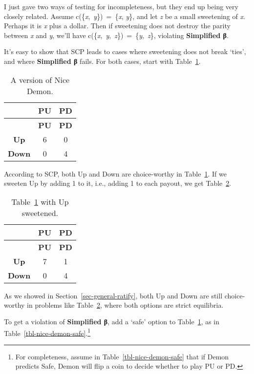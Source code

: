 \documentclass[
  10pt,
  letterpaper,
  DIV=11,
  numbers=noendperiod,
  twoside]{scrartcl}
\begin{document}
I just gave two ways of testing for incompleteness, but they end up
being very closely related. Assume
c(\{\emph{x},~\emph{y}\})~=~\{\emph{x}, \emph{y}\}, and let \emph{z} be
a small sweetening of \emph{x}. Perhaps it is \emph{x} plus a dollar.
Then if sweetening does not destroy the parity between \emph{x} and
\emph{y}, we'll have
c(\{\emph{x},~\emph{y},~\emph{z}\})~=~\{\emph{y},~\emph{z}\}, violating
\textbf{Simplified β}.

It's easy to show that SCP leads to cases where sweetening does not
break `ties', and where \textbf{Simplified β} fails. For both cases,
start with Table~\ref{tbl-nice-demon-linear}.

\begin{longtable}[]{@{}ccc@{}}
\caption{A version of Nice
Demon.}\label{tbl-nice-demon-linear}\tabularnewline
\toprule\noalign{}
& \textbf{PU} & \textbf{PD} \\
\midrule\noalign{}
\endfirsthead
\toprule\noalign{}
& \textbf{PU} & \textbf{PD} \\
\midrule\noalign{}
\endhead
\bottomrule\noalign{}
\endlastfoot
\textbf{Up} & 6 & 0 \\
\textbf{Down} & 0 & 4 \\
\end{longtable}

According to SCP, both Up and Down are choice-worthy in
Table~\ref{tbl-nice-demon-linear}. If we sweeten Up by adding 1 to it,
i.e., adding 1 to each payout, we get Table~\ref{tbl-nice-demon-plus}.

\begin{longtable}[]{@{}ccc@{}}
\caption{Table~\ref{tbl-nice-demon-linear} with Up
sweetened.}\label{tbl-nice-demon-plus}\tabularnewline
\toprule\noalign{}
& \textbf{PU} & \textbf{PD} \\
\midrule\noalign{}
\endfirsthead
\toprule\noalign{}
& \textbf{PU} & \textbf{PD} \\
\midrule\noalign{}
\endhead
\bottomrule\noalign{}
\endlastfoot
\textbf{Up} & 7 & 1 \\
\textbf{Down} & 0 & 4 \\
\end{longtable}

As we showed in Section~\ref{sec-general-ratify}, both Up and Down are
still choice-worthy in problems like Table~\ref{tbl-nice-demon-plus},
where both options are strict equilibria.

To get a violation of \textbf{Simplified β}, add a `safe' option to
Table~\ref{tbl-nice-demon-linear}, as in
Table~\ref{tbl-nice-demon-safe}.\footnote{For completeness, assume in
  Table~\ref{tbl-nice-demon-safe} that if Demon predicts Safe, Demon
  will flip a coin to decide whether to play PU or PD.}
\end{document}
